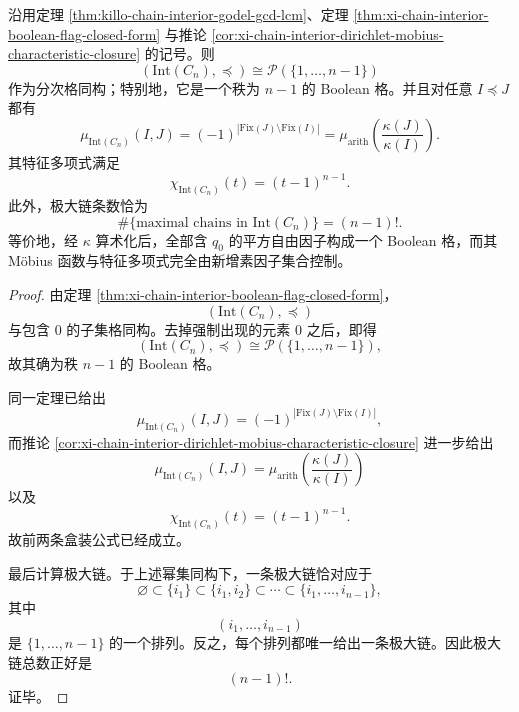 \begin{theorem}\label{thm:xi-chain-interior-boolean-mobius-characteristic-maxchains}
沿用定理 \ref{thm:killo-chain-interior-godel-gcd-lcm}、定理 \ref{thm:xi-chain-interior-boolean-flag-closed-form} 与推论 \ref{cor:xi-chain-interior-dirichlet-mobius-characteristic-closure} 的记号。则
\[
(\mathrm{Int}(C_n),\preceq)\cong \mathcal P(\{1,\dots,n-1\})
\]
作为分次格同构；特别地，它是一个秩为 \(n-1\) 的 Boolean 格。并且对任意 \(I\preceq J\) 都有
\[
\boxed{\;
\mu_{\mathrm{Int}(C_n)}(I,J)
=
(-1)^{|\mathrm{Fix}(J)\setminus \mathrm{Fix}(I)|}
=
\mu_{\mathrm{arith}}\!\left(\frac{\kappa(J)}{\kappa(I)}\right).\;}
\]
其特征多项式满足
\[
\boxed{\;
\chi_{\mathrm{Int}(C_n)}(t)=(t-1)^{n-1}.\;}
\]
此外，极大链条数恰为
\[
\boxed{\;
\#\{\text{maximal chains in }\mathrm{Int}(C_n)\}=(n-1)!.\;}
\]
等价地，经 \(\kappa\) 算术化后，全部含 \(q_0\) 的平方自由因子构成一个 Boolean 格，而其 Möbius 函数与特征多项式完全由新增素因子集合控制。
\end{theorem}
\begin{proof}
由定理 \ref{thm:xi-chain-interior-boolean-flag-closed-form}，
\[
(\mathrm{Int}(C_n),\preceq)
\]
与包含 \(0\) 的子集格同构。去掉强制出现的元素 \(0\) 之后，即得
\[
(\mathrm{Int}(C_n),\preceq)\cong \mathcal P(\{1,\dots,n-1\}),
\]
故其确为秩 \(n-1\) 的 Boolean 格。

同一定理已给出
\[
\mu_{\mathrm{Int}(C_n)}(I,J)
=
(-1)^{|\mathrm{Fix}(J)\setminus \mathrm{Fix}(I)|},
\]
而推论 \ref{cor:xi-chain-interior-dirichlet-mobius-characteristic-closure} 进一步给出
\[
\mu_{\mathrm{Int}(C_n)}(I,J)
=
\mu_{\mathrm{arith}}\!\left(\frac{\kappa(J)}{\kappa(I)}\right)
\]
以及
\[
\chi_{\mathrm{Int}(C_n)}(t)=(t-1)^{n-1}.
\]
故前两条盒装公式已经成立。

最后计算极大链。于上述幂集同构下，一条极大链恰对应于
\[
\varnothing
\subset
\{i_1\}
\subset
\{i_1,i_2\}
\subset\cdots\subset
\{i_1,\dots,i_{n-1}\},
\]
其中
\[
(i_1,\dots,i_{n-1})
\]
是 \(\{1,\dots,n-1\}\) 的一个排列。反之，每个排列都唯一给出一条极大链。因此极大链总数正好是
\[
(n-1)!.
\]
证毕。
\end{proof}

